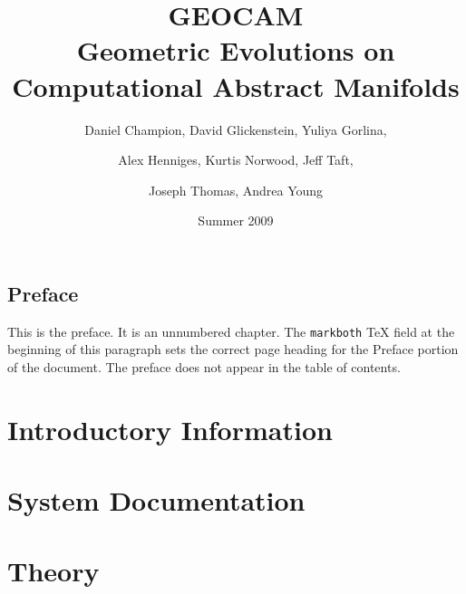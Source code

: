 \documentclass{book}
\begin{document}
\frontmatter
\title{GEOCAM\\
Geometric Evolutions on Computational Abstract Manifolds}
\author{Daniel Champion, David Glickenstein, Yuliya Gorlina,  \and Alex
Henniges, Kurtis Norwood, Jeff Taft,  \and Joseph Thomas, Andrea Young}
\date{Summer 2009}
\maketitle
\tableofcontents

\chapter*{Preface}

This is the preface. It is an unnumbered chapter.
The \verb|markboth| TeX field at the beginning of this paragraph sets the
correct page heading for the Preface portion of the document. The preface
does not appear in the table of contents.

\mainmatter

\part{Introductory Information}

%

%

\part{System Documentation}

%

%

%

%

\part{Theory}
\end{document}
